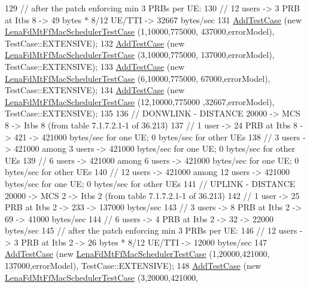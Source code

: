 \begin{DoxyCode}
129   \textcolor{comment}{// after the patch enforcing min 3 PRBs per UE:}
130   \textcolor{comment}{// 12 users -> 3 PRB at Itbs 8 -> 49 bytes * 8/12 UE/TTI -> 32667 bytes/sec}
131   \hyperlink{classns3_1_1TestCase_a3718088e3eefd5d6454569d2e0ddd835}{AddTestCase} (\textcolor{keyword}{new} \hyperlink{classLenaFdMtFfMacSchedulerTestCase}{LenaFdMtFfMacSchedulerTestCase} (1,10000,775000,
      437000,errorModel), TestCase::EXTENSIVE);
132   \hyperlink{classns3_1_1TestCase_a3718088e3eefd5d6454569d2e0ddd835}{AddTestCase} (\textcolor{keyword}{new} \hyperlink{classLenaFdMtFfMacSchedulerTestCase}{LenaFdMtFfMacSchedulerTestCase} (3,10000,775000,
      137000,errorModel), TestCase::EXTENSIVE);
133   \hyperlink{classns3_1_1TestCase_a3718088e3eefd5d6454569d2e0ddd835}{AddTestCase} (\textcolor{keyword}{new} \hyperlink{classLenaFdMtFfMacSchedulerTestCase}{LenaFdMtFfMacSchedulerTestCase} (6,10000,775000,
      67000,errorModel), TestCase::EXTENSIVE);
134   \hyperlink{classns3_1_1TestCase_a3718088e3eefd5d6454569d2e0ddd835}{AddTestCase} (\textcolor{keyword}{new} \hyperlink{classLenaFdMtFfMacSchedulerTestCase}{LenaFdMtFfMacSchedulerTestCase} (12,10000,775000
      ,32667,errorModel), TestCase::EXTENSIVE);
135  
136   \textcolor{comment}{// DONWLINK - DISTANCE 20000 -> MCS 8 -> Itbs 8 (from table 7.1.7.2.1-1 of 36.213)}
137   \textcolor{comment}{// 1 user -> 24 PRB at Itbs 8 -> 421 -> 421000 bytes/sec for one UE; 0 bytes/sec for other UEs}
138   \textcolor{comment}{// 3 users -> 421000 among 3 users -> 421000 bytes/sec for one UE; 0 bytes/sec for other UEs}
139   \textcolor{comment}{// 6 users -> 421000 among 6 users -> 421000 bytes/sec for one UE; 0 bytes/sec for other UEs}
140   \textcolor{comment}{// 12 users -> 421000 among 12 users -> 421000 bytes/sec for one UE; 0 bytes/sec for other UEs}
141   \textcolor{comment}{// UPLINK - DISTANCE 20000 -> MCS 2 -> Itbs 2 (from table 7.1.7.2.1-1 of 36.213)}
142   \textcolor{comment}{// 1 user -> 25 PRB at Itbs 2 -> 233 -> 137000 bytes/sec}
143   \textcolor{comment}{// 3 users -> 8 PRB at Itbs 2 -> 69 -> 41000 bytes/sec}
144   \textcolor{comment}{// 6 users -> 4 PRB at Itbs 2 -> 32 -> 22000 bytes/sec}
145   \textcolor{comment}{// after the patch enforcing min 3 PRBs per UE:}
146   \textcolor{comment}{// 12 users -> 3 PRB at Itbs 2 -> 26 bytes * 8/12 UE/TTI -> 12000 bytes/sec}
147   \hyperlink{classns3_1_1TestCase_a3718088e3eefd5d6454569d2e0ddd835}{AddTestCase} (\textcolor{keyword}{new} \hyperlink{classLenaFdMtFfMacSchedulerTestCase}{LenaFdMtFfMacSchedulerTestCase} (1,20000,421000,
      137000,errorModel), TestCase::EXTENSIVE);
148   \hyperlink{classns3_1_1TestCase_a3718088e3eefd5d6454569d2e0ddd835}{AddTestCase} (\textcolor{keyword}{new} \hyperlink{classLenaFdMtFfMacSchedulerTestCase}{LenaFdMtFfMacSchedulerTestCase} (3,20000,421000,

\end{DoxyCode}

